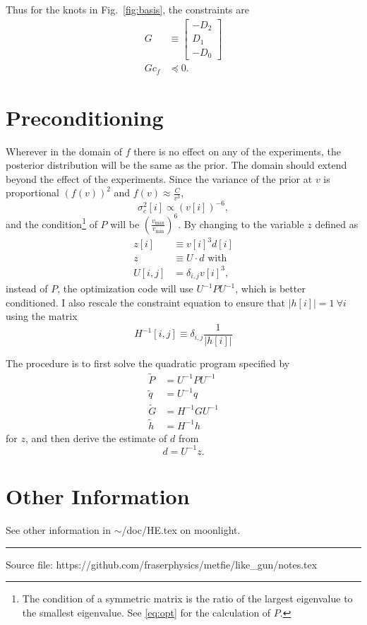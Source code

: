 \documentclass[11pt]{article}
\newcommand{\eos}{f}
\newcommand\cf{c_f}
\begin{document}
Thus for the knots in Fig.~\ref{fig:basis}, the constraints are
\begin{align}
  G & \equiv
      \begin{bmatrix}
        - D_2 \\ D_1 \\ -D_0
      \end{bmatrix}\\
  \label{eq:constraint}
  G\cf & \preceq 0.
\end{align}

\section{Preconditioning}
\label{sec:preconditioning}

Wherever in the domain of $\eos$ there is no effect on any of the
experiments, the posterior distribution will be the same as the prior.
The domain should extend beyond the effect of the experiments.
Since the variance of the prior at $v$ is proportional $(f(v))^2$ and
$f(v) \approx \frac{C}{v^3}$,
\begin{equation}
  \label{eq:var_f}
  \sigma^2_{c}[i] \propto (v[i])^{-6},
\end{equation}
and the condition\footnote{The condition of a symmetric matrix is the
  ratio of the largest eigenvalue to the smallest eigenvalue.  See
  \eqref{eq:opt} for the calculation of $P$.} of $P$ will be
$\left( \frac{v_{\text{max}}}{v_{\text{min}}} \right)^6$.  By
changing to the variable $z$ defined as
\begin{align*}
  z[i] &\equiv v[i]^3 d[i] \\
  z &\equiv U \cdot d \text{ with} \\
  U[i,j] &= \delta_{i,j} v[i]^3,
\end{align*}
\newcommand{\UI}{U^{-1}} instead of $P$, the optimization code will use
$\UI P \UI$, which is better conditioned.  I also rescale the
constraint equation to ensure that $\left| h[i] \right|=1~\forall i$
using the matrix
\begin{equation*}
  H^{-1}[i,j] \equiv \delta_{i,j} \frac{1}{\left|h[i]\right|}
\end{equation*}


The procedure is to first solve the quadratic program specified by
\begin{align*}
  \tilde P &= \UI P \UI \\
  \tilde q &= \UI q \\
  \tilde G &= H^{-1}G \UI \\
  \tilde h &= H^{-1}h
\end{align*}
for $z$, and then derive the estimate of $d$ from
\begin{equation*}
  d = \UI z.
\end{equation*}

\section{Other Information}
\label{sec:appendix}

See other information in $\sim$/doc/HE.tex on moonlight.

 
%
\vfill \hrule

Source file: https://github.com/fraserphysics/metfie/like\_gun/notes.tex
\end{document}

